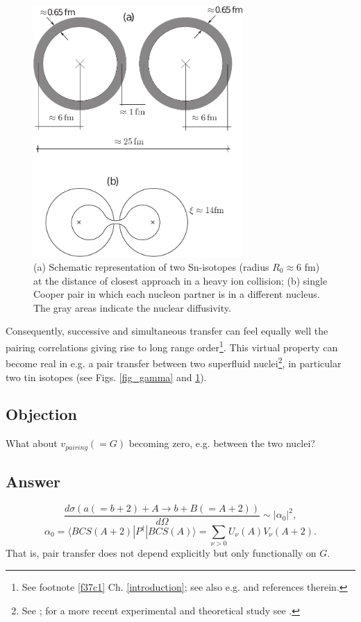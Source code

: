 \begin{figure}
\centerline{\includegraphics*[width=8cm,angle=0]{nutshell/figs/fig_1v2.pdf}}
\caption{(a) Schematic representation of two Sn-isotopes (radius $R_0\approx 6$ fm) at the distance of closest approach in a heavy ion collision; (b) single Cooper pair in which each nucleon partner is in a different nucleus. The gray areas indicate the nuclear diffusivity.}\label{fig_1}
\end{figure}


Consequently, successive and simultaneous transfer can feel equally well the pairing correlations giving rise to long range order\footnote{See footnote \ref{f37c1} Ch. \ref{introduction}; see also e.g. \cite{Potel:17} and references therein.}. This virtual property can become real in e.g. a pair transfer between two superfluid nuclei\footnote{See \cite{Oertzen:13,vonOertzen:01,Weiss:79}; for a more recent experimental and theoretical study see \cite{Montanari:14,Montanari:16}.}, in particular two tin isotopes (see Figs. \ref{fig_gamma} and \ref{fig_1}).
\subsection*{Objection}
What about $v_{pairing}(=G)$ becoming zero, e.g. between the two nuclei?
\subsection*{Answer}
\begin{equation}
\frac{d\sigma(a(=b+2)+A\rightarrow b+B(=A+2))}{d\Omega}\sim |\alpha_0|^2,
\end{equation}
\begin{equation}\label{eqtrans_nut1}
\alpha_0=\langle BCS(A+2) |P^\dagger|BCS(A)\rangle=\sum_{\nu>0}U_{\nu}(A)V_{\nu}(A+2).
\end{equation}
That is, pair transfer does not depend explicitly but only functionally on $G$.
